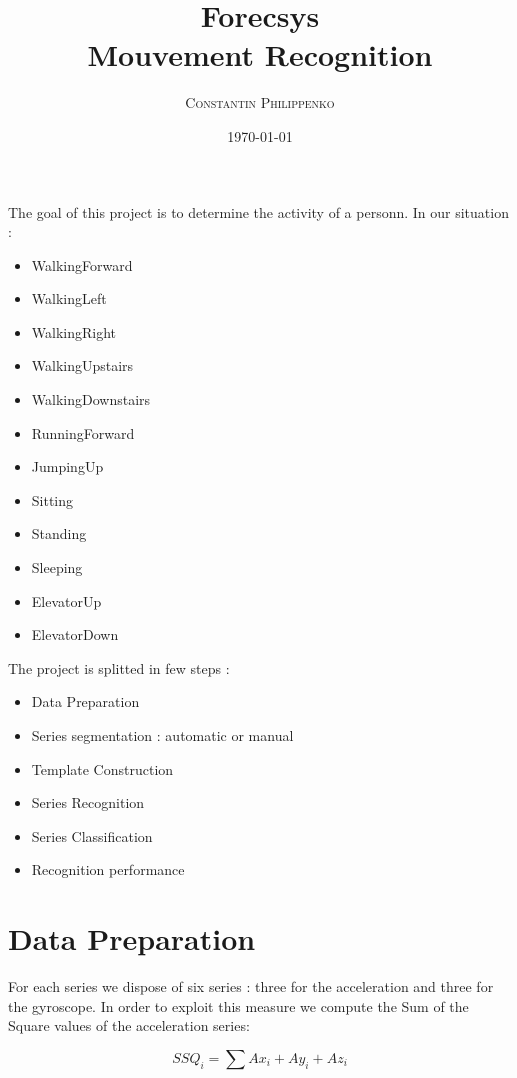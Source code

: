 \documentclass[a4,12pt]{article}
\title{\textbf{Forecsys \\ Mouvement Recognition}}
\author{                                                                         
	\begin{tabular}{cc}                                                              
	        \textsc{Constantin Philippenko	}
	\end{tabular}}
\date{\small \today}
\begin{document}
  
	
	\maketitle 
	
	\newpage		
	\renewcommand{\contentsname}{Sommaire}
	\tableofcontents
	\newpage
	
	The goal of this project is to determine the activity of a personn. In our situation :
	\begin{itemize}
		\item WalkingForward
		\item WalkingLeft
		\item WalkingRight
		\item WalkingUpstairs
		\item WalkingDownstairs
		\item RunningForward
		\item JumpingUp
		\item Sitting
		\item Standing
		\item Sleeping
		\item ElevatorUp
		\item ElevatorDown
	\end{itemize}

	\medskip
	
	The project is splitted in few steps :
	
	\begin{itemize}
		\item Data Preparation
		\item Series segmentation : automatic or manual
		\item Template Construction 
		\item Series Recognition
		\item Series Classification 
		\item Recognition performance
	\end{itemize}
	
	\medskip
	
	\section{Data Preparation}
	
	For each series we dispose of six series : three for the acceleration and three for the gyroscope.
	In order to exploit this measure we compute the Sum of the Square values of the acceleration series:
	
	\[ SSQ_i = \sum Ax_i + Ay_i+ Az_i \]
	
\end{document}
